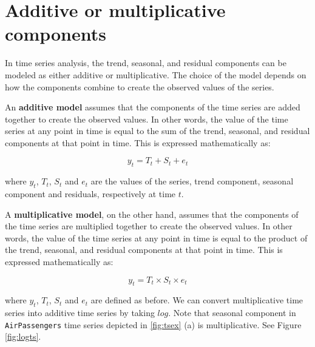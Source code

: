 \documentclass[
]{book}
\begin{document}
\hypertarget{additive-or-multiplicative-components}{%
\section{Additive or multiplicative components}\label{additive-or-multiplicative-components}}

In time series analysis, the trend, seasonal, and residual components can be modeled as either additive or multiplicative. The choice of the model depends on how the components combine to create the observed values of the series.

An \textbf{additive model} assumes that the components of the time series are added together to create the observed values. In other words, the value of the time series at any point in time is equal to the sum of the trend, seasonal, and residual components at that point in time. This is expressed mathematically as:

\[
y_t = T_t + S_t + e_t
\]

where \(y_t\), \(T_t\), \(S_t\) and \(e_t\) are the values of the series, trend component, seasonal component and residuals, respectively at time \(t\).

A \textbf{multiplicative model}, on the other hand, assumes that the components of the time series are multiplied together to create the observed values. In other words, the value of the time series at any point in time is equal to the product of the trend, seasonal, and residual components at that point in time. This is expressed mathematically as:

\[
y_t = T_t \times S_t \times e_t
\]

where \(y_t\), \(T_t\), \(S_t\) and \(e_t\) are defined as before. We can convert multiplicative time series into additive time series by taking \(log\). Note that seasonal component in \texttt{AirPassengers} time series depicted in \ref{fig:tsex} (a) is multiplicative. See Figure \ref{fig:logts}.
\end{document}

